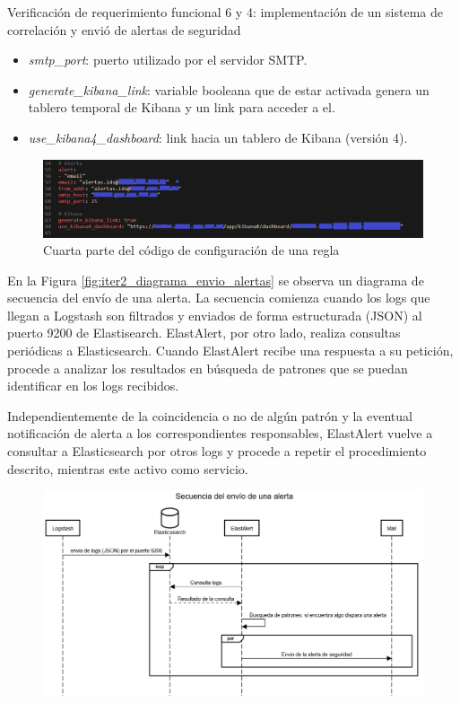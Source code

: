 \begin{section}{Verificación de requerimiento funcional 6 y 4: implementación de un sistema de correlación y envió de alertas de seguridad}
\begin{itemize}
        \item \textit{smtp\_port}: puerto utilizado por el servidor SMTP.
        \item \textit{generate\_kibana\_link}: variable booleana que de estar activada genera un tablero temporal de Kibana y un link para acceder a el.
        \item \textit{use\_kibana4\_dashboard}: link hacia un tablero de Kibana (versión 4).
    \end{itemize}
    \begin{figure}[H]
    \centering
        \includegraphics[width=1\textwidth]{./iteracion_2_imagenes/6-codigoAlerta4.png}
        \caption{Cuarta parte del código de configuración de una regla}
        \label{fig:iter2_4_codigo}
    \end{figure}
    \FloatBarrier
    En la Figura \ref{fig:iter2_diagrama_envio_alertas} se observa un diagrama de secuencia del envío de una alerta.
    La secuencia comienza cuando los logs que llegan a Logstash son filtrados y enviados de forma estructurada (JSON) al puerto 9200 de Elastisearch. ElastAlert, por otro lado, realiza consultas periódicas a Elasticsearch. Cuando ElastAlert recibe una respuesta a su petición, procede a analizar los resultados en búsqueda de patrones que se puedan identificar en los logs recibidos. \par
    Independientemente de la coincidencia o no de algún patrón y la eventual notificación de alerta a los correspondientes responsables, ElastAlert vuelve a consultar a Elasticsearch por otros logs y procede a repetir el procedimiento descrito, mientras este activo como servicio.\par 
    \begin{figure}[H]
    \centering
        \includegraphics[width=1\textwidth]{./iteracion_2_imagenes/2-diagrama-de-secuencia-envio-alerta.png}

\end{figure}
\end{section}
